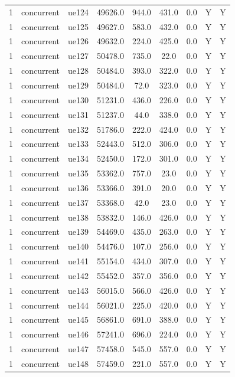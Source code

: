 \begin{table}[ht]
\begin{tabular}{|c|c|c|c|c|c|c|c|c|}
1 & concurrent & ue124 & 49626.0 & 944.0 & 431.0 & 0.0 & Y & Y \\
1 & concurrent & ue125 & 49627.0 & 583.0 & 432.0 & 0.0 & Y & Y \\
1 & concurrent & ue126 & 49632.0 & 224.0 & 425.0 & 0.0 & Y & Y \\
1 & concurrent & ue127 & 50478.0 & 735.0 & 22.0 & 0.0 & Y & Y \\
1 & concurrent & ue128 & 50484.0 & 393.0 & 322.0 & 0.0 & Y & Y \\
1 & concurrent & ue129 & 50484.0 & 72.0 & 323.0 & 0.0 & Y & Y \\
1 & concurrent & ue130 & 51231.0 & 436.0 & 226.0 & 0.0 & Y & Y \\
1 & concurrent & ue131 & 51237.0 & 44.0 & 338.0 & 0.0 & Y & Y \\
1 & concurrent & ue132 & 51786.0 & 222.0 & 424.0 & 0.0 & Y & Y \\
1 & concurrent & ue133 & 52443.0 & 512.0 & 306.0 & 0.0 & Y & Y \\
1 & concurrent & ue134 & 52450.0 & 172.0 & 301.0 & 0.0 & Y & Y \\
1 & concurrent & ue135 & 53362.0 & 757.0 & 23.0 & 0.0 & Y & Y \\
1 & concurrent & ue136 & 53366.0 & 391.0 & 20.0 & 0.0 & Y & Y \\
1 & concurrent & ue137 & 53368.0 & 42.0 & 23.0 & 0.0 & Y & Y \\
1 & concurrent & ue138 & 53832.0 & 146.0 & 426.0 & 0.0 & Y & Y \\
1 & concurrent & ue139 & 54469.0 & 435.0 & 263.0 & 0.0 & Y & Y \\
1 & concurrent & ue140 & 54476.0 & 107.0 & 256.0 & 0.0 & Y & Y \\
1 & concurrent & ue141 & 55154.0 & 434.0 & 307.0 & 0.0 & Y & Y \\
1 & concurrent & ue142 & 55452.0 & 357.0 & 356.0 & 0.0 & Y & Y \\
1 & concurrent & ue143 & 56015.0 & 566.0 & 426.0 & 0.0 & Y & Y \\
1 & concurrent & ue144 & 56021.0 & 225.0 & 420.0 & 0.0 & Y & Y \\
1 & concurrent & ue145 & 56861.0 & 691.0 & 388.0 & 0.0 & Y & Y \\
1 & concurrent & ue146 & 57241.0 & 696.0 & 224.0 & 0.0 & Y & Y \\
1 & concurrent & ue147 & 57458.0 & 545.0 & 557.0 & 0.0 & Y & Y \\
1 & concurrent & ue148 & 57459.0 & 221.0 & 557.0 & 0.0 & Y & Y \\

\end{tabular}
\end{table}
